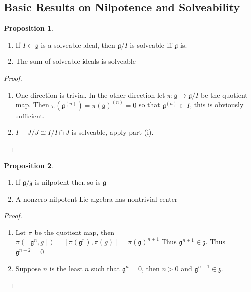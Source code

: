 \documentclass[10.5pt]{article}
\theoremstyle{definition}
\newtheorem{proposition}{Proposition}
\numberwithin{example}{subsection}
\numberwithin{proposition}{subsection}
\numberwithin{pb}{subsection}
\begin{document}
    \subsection{Basic Results on Nilpotence and Solveability}
        \begin{proposition}\label{basicsolveability}
            \begin{enumerate}
                \item If \(I \subset \mathfrak{g}\) is a solveable ideal, then \(\mathfrak{g}/I\) is solveable iff \(\mathfrak{g}\) is.
                \item The sum of solveable ideals is solveable
            \end{enumerate}
            \begin{proof}
                \begin{enumerate}
                    \item One direction is trivial. In the other direction let \(\pi: \mathfrak{g} \to \mathfrak{g}/I\) be the quotient map. Then \(\pi(\mathfrak{g}^{(n)}) = \pi(\mathfrak{g})^{(n)} = 0\) so that \(\mathfrak{g}^{(n)} \subset I\), this is obviously sufficient.
                    \item \(I + J/J \cong I/I \cap J\) is solveable, apply part (i).
                \end{enumerate}
            \end{proof}
        \end{proposition}
        \begin{proposition}\label{basicnilpotence}
            \begin{enumerate}
                \item If \(\mathfrak{g}/\mathfrak{z}\) is nilpotent then so is \(\mathfrak{g}\)
                \item A nonzero nilpotent Lie algebra has nontrivial center
            \end{enumerate}
        
            \begin{proof}
                \begin{enumerate}
                    \item Let \(\pi\) be the quotient map, then \(\pi([\mathfrak{g}^n,g]) = [\pi(\mathfrak{g}^n),\pi(g)] = \pi(\mathfrak{g})^{n+1}\) Thus \(\mathfrak{g}^{n+1} \in \mathfrak{z}\). Thus \(\mathfrak{g}^{n+2} = 0\)
                    \item Suppose \(n\) is the least \(n\) such that \(\mathfrak{g}^n = 0\), then \(n > 0\) and \(\mathfrak{g}^{n-1} \in \mathfrak{z}\).
                \end{enumerate}
            \end{proof}
        \end{proposition}
\end{document}
